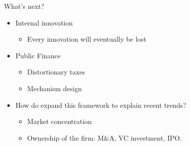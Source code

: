 \documentclass[usenames,dvipsnames,aspectratio=169]{beamer}
\begin{document}
\begin{frame}{What's next?}

\begin{itemize}[label=\textcolor{teal}{$\blacktriangleright$}]
\vfill
\item Internal innovation  
\begin{itemize}[label=\textcolor{teal}{$\star$}]
\item Every innovation will eventually be lost
\end{itemize}
\vfill
\item Public Finance
\begin{itemize}[label=\textcolor{teal}{$\star$}]
\item Distortionary taxes
\item Mechanism design
\end{itemize}
\vfill 
\item How do expand this framework to explain recent trends?
\begin{itemize}[label=\textcolor{teal}{$\star$}]
\item Market concentration
\item Ownership of the firm: M\&A, VC investment, IPO. 
\end{itemize}
\vfill
\end{itemize}

\end{frame}
\end{document}
